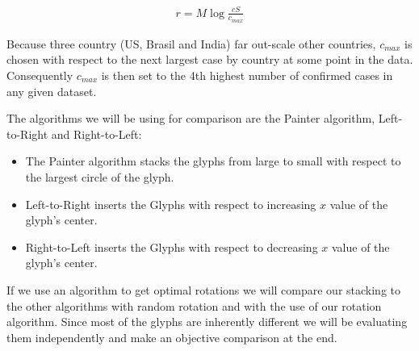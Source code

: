\documentclass[a4paper,11pt]{article}
\begin{document}
\begin{align*}
  r=M\log\frac{c S}{c_{max}}
\end{align*}

Because three country (US, Brasil and India) far out-scale other countries, $c_{max}$ is chosen with respect to the next largest case by country at some point in the data. Consequently $c_{max}$ is then set to the 4th highest number of confirmed cases in any given dataset.

The algorithms we will be using for comparison are the Painter algorithm, Left-to-Right and Right-to-Left:

\begin{itemize}
  \item The Painter algorithm stacks the glyphs from large to small with respect to the largest circle of the glyph.
  \item Left-to-Right inserts the Glyphs with respect to increasing $x$ value of the glyph's center.
  \item Right-to-Left inserts the Glyphs with respect to decreasing $x$ value of the glyph's center.
\end{itemize}

If we use an algorithm to get optimal rotations we will compare our stacking to the other algorithms with random rotation and with the use of our rotation algorithm. Since most of the glyphs are inherently different we will be evaluating them independently and make an objective comparison at the end.
\end{document}

